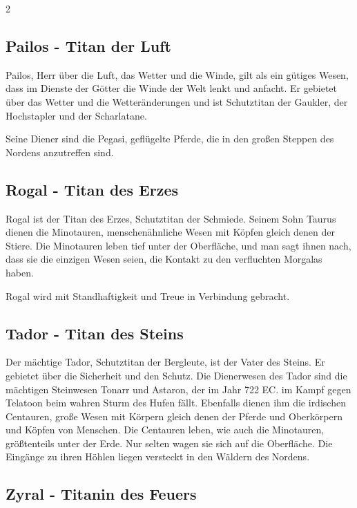 \begin{multicols*}{2}
\subsection{Pailos - Titan der Luft}\label{subsec:pailos-titan-der-luft}

Pailos, Herr über die Luft, das Wetter und die Winde, gilt als ein gütiges Wesen, dass im Dienste der Götter die Winde der Welt lenkt und anfacht.
Er gebietet über das Wetter und die Wetteränderungen und ist Schutztitan der Gaukler, der Hochstapler und der Scharlatane.

Seine Diener sind die Pegasi, geflügelte Pferde, die in den großen Steppen des Nordens anzutreffen sind.

\subsection{Rogal - Titan des Erzes}\label{subsec:rogal-titan-des-erzes}

Rogal ist der Titan des Erzes, Schutztitan der Schmiede.
Seinem Sohn Taurus dienen die Minotauren, menschenähnliche Wesen mit Köpfen gleich denen der Stiere.
Die Minotauren leben tief unter der Oberfläche, und man sagt ihnen nach, dass sie die einzigen Wesen seien, die Kontakt zu den verfluchten Morgalas haben.

Rogal wird mit Standhaftigkeit und Treue in Verbindung gebracht.

\subsection{Tador - Titan des Steins}\label{subsec:tador-titan-des-steins}

Der mächtige Tador, Schutztitan der Bergleute, ist der Vater des Steins.
Er gebietet über die Sicherheit und den Schutz.
Die Dienerwesen des Tador sind die mächtigen Steinwesen Tonarr und Astaron, der im Jahr 722 EC. im Kampf gegen Telatoon beim wahren Sturm des Hufen fällt.
Ebenfalls dienen ihm die irdischen Centauren, große Wesen mit Körpern gleich denen der Pferde und Oberkörpern und Köpfen von Menschen.
Die Centauren leben, wie auch die Minotauren, größtenteils unter der Erde.
Nur selten wagen sie sich auf die Oberfläche.
Die Eingänge zu ihren Höhlen liegen versteckt in den Wäldern des Nordens.

\subsection{Zyral - Titanin des Feuers}\label{subsec:zyral-titanin-des-feuers}


\end{multicols*}
